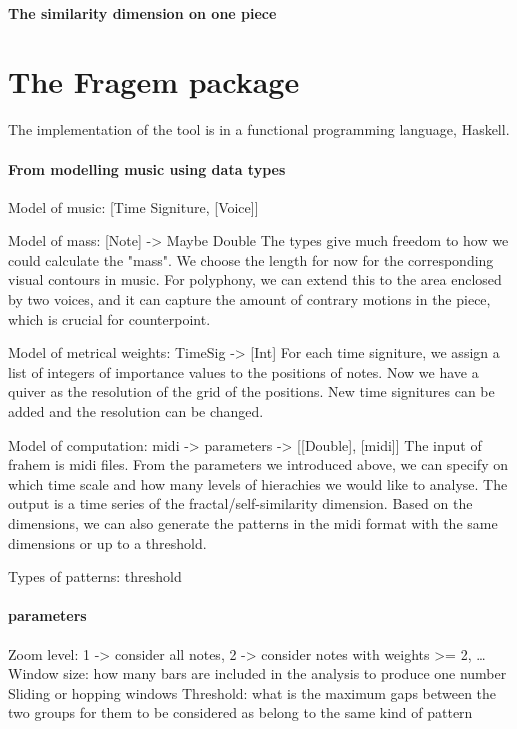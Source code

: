 \documentclass[acmsmall,review,anonymous]{acmart}\settopmatter{printfolios=true,printccs=false,printacmref=false}
\begin{document}
\paragraph{The similarity dimension on one piece}

\section{The Fragem package}
The implementation of the tool is in a functional programming language, Haskell.

\paragraph{From modelling music using data types}
Model of music: [Time Signiture, [Voice]]

Model of mass: [Note] -> Maybe Double
The types give much freedom to how we could calculate the "mass". We choose the length for now for the corresponding visual contours in music. For polyphony, we can extend this to the area enclosed by two voices, and it can capture the amount of contrary motions in the piece, which is crucial for counterpoint.

Model of metrical weights: TimeSig -> [Int]
For each time signiture, we assign a list of integers of importance values to the positions of notes. Now we have a quiver as the resolution of the grid of the positions. New time signitures can be added and the resolution can be changed.

Model of computation: midi -> parameters -> [[Double], [midi]]
The input of frahem is midi files. From the parameters we introduced above, we can specify on which time scale and how many levels of hierachies we would like to analyse. The output is a time series of the fractal/self-similarity dimension. Based on the dimensions, we can also generate the patterns in the midi format with the same dimensions or up to a threshold.

Types of patterns: threshold

\paragraph{parameters}
Zoom level: 1 -> consider all notes, 2 -> consider notes with weights >= 2, …
Window size: how many bars are included in the analysis to produce one number
Sliding or hopping windows
Threshold: what is the maximum gaps between the two groups for them to be considered as belong to the same kind of pattern
\end{document}
